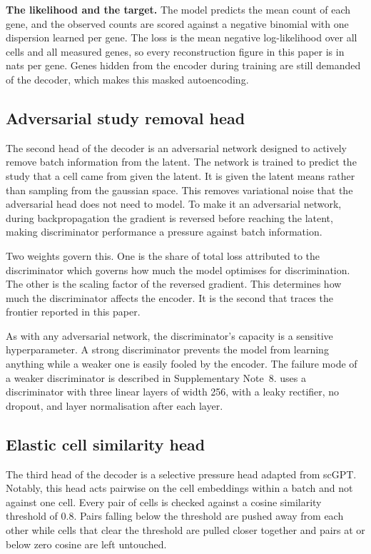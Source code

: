\textbf{The likelihood and the target.} The model predicts the mean 
count of each gene, and the observed counts are scored against a negative 
binomial with one dispersion learned per gene. The loss is the mean 
negative log-likelihood over all cells and all measured genes, so every 
reconstruction figure in this paper is in nats per gene. Genes hidden 
from the encoder during training are still demanded of the decoder, 
which makes this masked autoencoding.

\subsection*{Adversarial study removal head}

The second head of the decoder is an adversarial network designed to 
actively remove batch information from the latent. The network is trained to 
predict the study that a cell came from given the latent. It is given the 
latent means rather than sampling from the gaussian space. This 
removes variational noise that the adversarial head does not need to model. 
To make it an adversarial network, during backpropagation the gradient is 
reversed before reaching the latent, making discriminator performance a 
pressure against batch information.

Two weights govern this. One is the share of total loss attributed to the 
discriminator which governs how much the model optimises for discrimination. 
The other is the scaling factor of the reversed gradient. This determines 
how much the discriminator affects the encoder. It is the second that 
traces the frontier reported in this paper. 

As with any adversarial network, the discriminator's capacity is a sensitive 
hyperparameter. A strong discriminator prevents the model from learning 
anything while a weaker one is easily fooled by the encoder. The failure 
mode of a weaker discriminator is described in Supplementary Note~8. \elaj uses a 
discriminator with three linear layers of width 256, with a leaky rectifier, no
dropout, and layer normalisation after each layer.

\subsection*{Elastic cell similarity head}

The third head of the decoder is a selective pressure head adapted from 
scGPT. Notably, this head acts pairwise on the cell embeddings within a 
batch and not against one cell. Every pair of cells is checked against a 
cosine similarity threshold of 0.8. Pairs falling below the threshold are 
pushed away from each other while cells that clear the threshold are pulled 
closer together and pairs at or below zero cosine are left untouched. 


